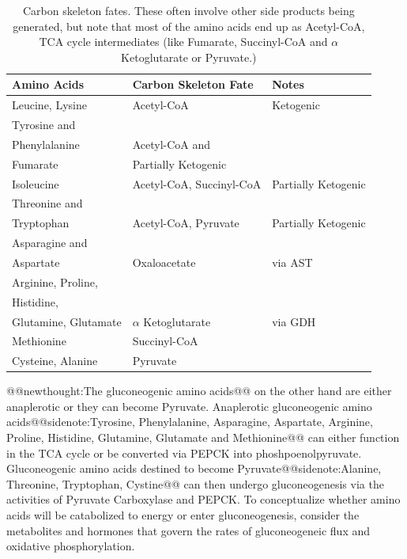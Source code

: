 \documentclass{tufte-handout}
\makeatletter
\def\newthought#1{@@newthought:#1@@}
\def\sidenote#1{@@sidenote:#1@@}
\makeatother
\begin{document}
\begin{table}[]
\centering
\caption{Carbon skeleton fates.  These often involve other side products being generated, but note that most of the amino acids end up as Acetyl-CoA, TCA cycle intermediates (like Fumarate, Succinyl-CoA and $\alpha$ Ketoglutarate or Pyruvate.)}
\label{tab:carbon-skeletons}
\begin{tabular}{lll}
\textbf{Amino Acids}                                        & \textbf{Carbon Skeleton Fate}        & \textbf{Notes}                 \\ \hline
Leucine, Lysine                                    & Acetyl-CoA\index{Metabolites!Acetyl-CoA}                  & Ketogenic  \\ \hline
Tyrosine and\\ Phenylalanine                         & Acetyl-CoA and\\ Fumarate     & Partially Ketogenic   \\ \hline
Isoleucine                                         & Acetyl-CoA, Succinyl-CoA & Partially Ketogenic   \\ \hline
Threonine and\\ Tryptophan                           & Acetyl-CoA, Pyruvate     & Partially Ketogenic   \\ \hline
Asparagine and\\ Aspartate                           & Oxaloacetate                & via AST               \\ \hline
Arginine, Proline,\\ Histidine,\\ Glutamine, Glutamate & $\alpha$ Ketoglutarate      & via GDH               \\ \hline
Methionine                                         & Succinyl-CoA                &                       \\ \hline
Cysteine, Alanine                                  & Pyruvate                    &                      
\end{tabular}
\end{table}

\newthought{The gluconeogenic amino acids} on the other hand are either anaplerotic or they can become Pyruvate. Anaplerotic gluconeogenic amino acids\sidenote{Tyrosine, Phenylalanine, Asparagine, Aspartate, Arginine, Proline, Histidine, Glutamine,  Glutamate and Methionine} can either function in the TCA cycle or be converted via PEPCK into phoshpoenolpyruvate.  Gluconeogenic amino acids destined  to become Pyruvate\sidenote{Alanine, Threonine, Tryptophan, Cystine}  can then undergo gluconeogenesis via the activities of Pyruvate Carboxylase and PEPCK. To conceptualize whether amino acids will be catabolized to energy or enter gluconeogenesis, consider the metabolites and hormones that govern the rates of gluconeogeneic flux and oxidative phosphorylation.
\end{document}
